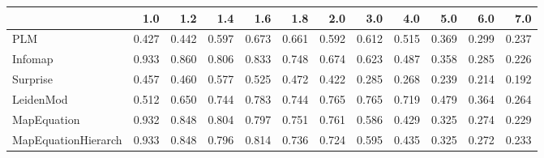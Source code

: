 \begin{tabular}{lrrrrrrrrrrr}
\toprule
{} &   1.0 &   1.2 &   1.4 &   1.6 &   1.8 &   2.0 &   3.0 &   4.0 &   5.0 &   6.0 &   7.0 \\
\midrule
PLM                 & 0.427 & 0.442 & 0.597 & 0.673 & 0.661 & 0.592 & 0.612 & 0.515 & 0.369 & 0.299 & 0.237 \\
Infomap             & 0.933 & 0.860 & 0.806 & 0.833 & 0.748 & 0.674 & 0.623 & 0.487 & 0.358 & 0.285 & 0.226 \\
Surprise            & 0.457 & 0.460 & 0.577 & 0.525 & 0.472 & 0.422 & 0.285 & 0.268 & 0.239 & 0.214 & 0.192 \\
LeidenMod           & 0.512 & 0.650 & 0.744 & 0.783 & 0.744 & 0.765 & 0.765 & 0.719 & 0.479 & 0.364 & 0.264 \\
MapEquation         & 0.932 & 0.848 & 0.804 & 0.797 & 0.751 & 0.761 & 0.586 & 0.429 & 0.325 & 0.274 & 0.229 \\
MapEquationHierarch & 0.933 & 0.848 & 0.796 & 0.814 & 0.736 & 0.724 & 0.595 & 0.435 & 0.325 & 0.272 & 0.233 \\
\bottomrule
\end{tabular}

